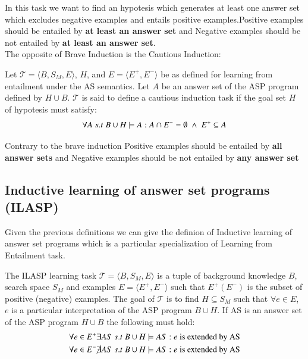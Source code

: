 In this task we want to find an hypotesis which generates at least one answer set which excludes negative 
examples and entails positive examples.Positive examples should be entailed by \textbf{at least an answer set}
and Negative examples should be not entailed by \textbf{at least an answer set}.\\

The opposite of Brave Induction is the Cautious Induction:
\begin{tcolorbox}[colback=red!5!white,colframe=red!75!black,title=\textbf{Definition 7: Cautious induction task}]
    Let $\mathcal{T}=\langle B,S_M, E\rangle$, $H$, and $E=\langle E^+,E^- \rangle$ be as defined for learning from entailment 
    under the AS semantics. Let $A$ be an answer set of the ASP program defined by $H \cup B$.
    $\mathcal{T}$ is said to define a cautious induction task if the goal set $H$ of hypotesis must satisfy:
    \begin{equation*}
        \forall A\;s.t\;B \cup H \models A: A\cap E^- =\emptyset\;\land\;E^+\subseteq A
    \end{equation*}
\end{tcolorbox}

Contrary to the brave induction Positive examples should be entailed by \textbf{all answer sets} and Negative examples should be not entailed by
\textbf{any answer set}

\subsection{Inductive learning of answer set programs (ILASP)}
Given the previous definitions we can give the definion of Inductive learning of answer set programs \cite{LAW2018110} which is a particular specialization
of Learning from Entailment task.

\begin{tcolorbox}[colback=red!5!white,colframe=red!75!black,title=\textbf{Definition}]
The ILASP learning task $\mathcal{T}=\langle B,S_M, E\rangle$ is a tuple of background knowledge $B$, search space $S_M$ and examples $E=\langle E^+,E^- \rangle$ 
such that $E^+ (E^-)$ is the subset of positive (negative) examples. The goal of $\mathcal{T}$ is to find $H \subseteq S_M$ such that $\forall e\in E$, $e$ is a 
particular interpretation of the ASP program $B\cup H$. If AS is an answer set of the ASP program $H\cup B$ the following must hold:
\begin{align*}
    \forall e \in E^+\exists AS\;s.t\; B\cup H\models AS: e \;\text{is extended by AS}\\
    \forall e \in E^-\cancel{\exists} AS\;s.t\; B\cup H\models AS: e \;\text{is extended by AS}
\end{align*}
\end{tcolorbox}

